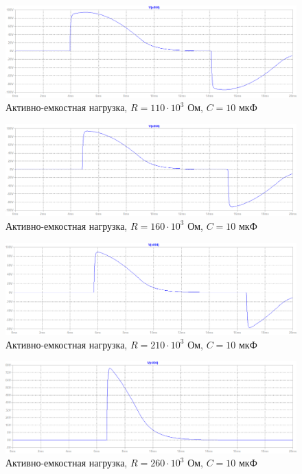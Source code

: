 \documentclass[a4paper, 12pt]{article}
\begin{document}
    \begin{figure}[H]
        \centering
        \includegraphics[scale=0.45]{R2-110k_C10u.png}
        \captionsetup{skip=0pt}
        \caption{Активно-емкостная нагрузка, $R=110\cdot10^3$ Ом, $C=10$ мкФ}
        \label{fig:R2-110k_C10u}
    \end{figure}
    \begin{figure}[H]
        \centering
        \includegraphics[scale=0.45]{R2-160k_C10u.png}
        \captionsetup{skip=0pt}
        \caption{Активно-емкостная нагрузка, $R=160\cdot10^3$ Ом, $C=10$ мкФ}
        \label{fig:R2-160k_C10u}
    \end{figure}
    \begin{figure}[H]
        \centering
        \includegraphics[scale=0.45]{R2-210k_C10u.png}
        \captionsetup{skip=0pt}
        \caption{Активно-емкостная нагрузка, $R=210\cdot10^3$ Ом, $C=10$ мкФ}
        \label{fig:R2-210k_C10u}
    \end{figure}
    \begin{figure}[H]
        \centering
        \includegraphics[scale=0.45]{R2-260k_C10u.png}
        \captionsetup{skip=0pt}
        \caption{Активно-емкостная нагрузка, $R=260\cdot10^3$ Ом, $C=10$ мкФ}
        \label{fig:R2-260k_C10u}
    \end{figure}
\end{document}
